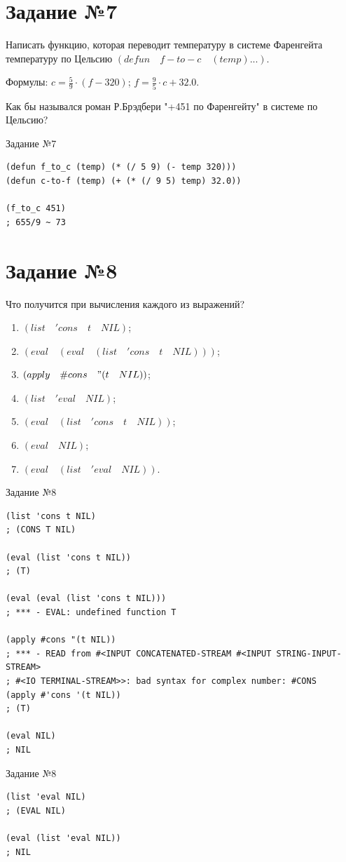 \section{Задание №7}
Написать функцию, которая переводит температуру в системе Фаренгейта температуру по Цельсию $(defun \quad f-to-c \quad (temp)...)$.

Формулы: $c = \frac{5}{9} \cdot (f - 320)$; $f = \frac{9}{5} \cdot c + 32.0$.

Как бы назывался роман Р.Брэдбери "+451 по Фаренгейту" в системе по Цельсию?

\begin{code}
\caption{Задание №7}
\label{code:bf4}
\begin{verbatim}
(defun f_to_c (temp) (* (/ 5 9) (- temp 320)))
(defun c-to-f (temp) (+ (* (/ 9 5) temp) 32.0))

(f_to_c 451)
; 655/9 ~ 73
\end{verbatim}
\end{code}

\newpage

\section{Задание №8}
Что получится при вычисления каждого из выражений?
\begin{enumerate}
	\item $(list \quad 'cons \quad t \quad NIL)$;
	\item $(eval \quad (eval \quad (list \quad 'cons \quad t \quad NIL)))$;
	\item $(apply \quad \#cons \quad "(t \quad NIL))$;
	\item $(list \quad 'eval \quad NIL)$;
	\item $(eval \quad (list \quad 'cons \quad t \quad NIL))$;
	\item $(eval \quad NIL)$;
	\item $(eval \quad (list \quad 'eval \quad NIL))$.
\end{enumerate}

\begin{code}
\caption{Задание №8}
\label{code:bf4}
\begin{verbatim}
(list 'cons t NIL)
; (CONS T NIL)

(eval (list 'cons t NIL))
; (T)

(eval (eval (list 'cons t NIL)))
; *** - EVAL: undefined function T

(apply #cons "(t NIL))
; *** - READ from #<INPUT CONCATENATED-STREAM #<INPUT STRING-INPUT-STREAM> 
; #<IO TERMINAL-STREAM>>: bad syntax for complex number: #CONS
(apply #'cons '(t NIL))
; (T)

(eval NIL)
; NIL
\end{verbatim}
\end{code}

\newpage

\begin{code}
\caption{Задание №8}
\label{code:bf4}
\begin{verbatim}
(list 'eval NIL)
; (EVAL NIL)

(eval (list 'eval NIL))
; NIL
\end{verbatim}
\end{code}

\newpage